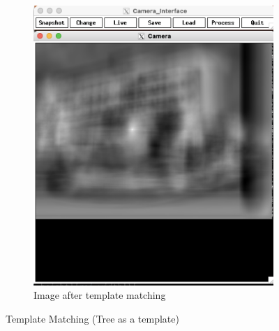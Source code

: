 \documentclass[12pt]{article}
\begin{document}
\begin{figure}
\begin{subfigure}[b]{0.475\textwidth}
		\includegraphics[width=\textwidth]{hw3_results/p2_tree_template}
		\caption[]%
		{{\small Image after template matching}}    
		\label{fig:ned_result2}
	\end{subfigure}
	\caption[ ]
	{\small Template Matching (Tree as a template)} 
	\label{fig:ned_temp2}
\end{figure}
\end{document}
